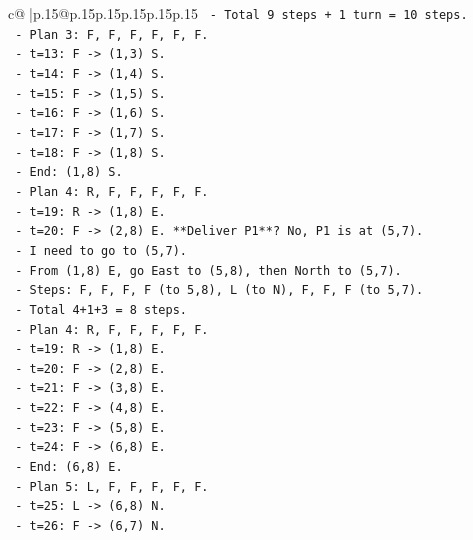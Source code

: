 \documentclass{article}
\begin{document}
{\begin{supertabular}{c@{$\;$}|p{.15\linewidth}@{}p{.15\linewidth}p{.15\linewidth}p{.15\linewidth}p{.15\linewidth}p{.15\linewidth}}
{{{\texttt{              {-} Total 9 steps + 1 turn = 10 steps.} \\
\texttt{              {-} Plan 3: F, F, F, F, F, F.} \\
\texttt{                {-} t=13: F {-}> (1,3) S.} \\
\texttt{                {-} t=14: F {-}> (1,4) S.} \\
\texttt{                {-} t=15: F {-}> (1,5) S.} \\
\texttt{                {-} t=16: F {-}> (1,6) S.} \\
\texttt{                {-} t=17: F {-}> (1,7) S.} \\
\texttt{                {-} t=18: F {-}> (1,8) S.} \\
\texttt{                {-} End: (1,8) S.} \\
\texttt{              {-} Plan 4: R, F, F, F, F, F.} \\
\texttt{                {-} t=19: R {-}> (1,8) E.} \\
\texttt{                {-} t=20: F {-}> (2,8) E. **Deliver P1**? No, P1 is at (5,7).} \\
\texttt{                {-} I need to go to (5,7).} \\
\texttt{                {-} From (1,8) E, go East to (5,8), then North to (5,7).} \\
\texttt{                {-} Steps: F, F, F, F (to 5,8), L (to N), F, F, F (to 5,7).} \\
\texttt{                {-} Total 4+1+3 = 8 steps.} \\
\texttt{                {-} Plan 4: R, F, F, F, F, F.} \\
\texttt{                  {-} t=19: R {-}> (1,8) E.} \\
\texttt{                  {-} t=20: F {-}> (2,8) E.} \\
\texttt{                  {-} t=21: F {-}> (3,8) E.} \\
\texttt{                  {-} t=22: F {-}> (4,8) E.} \\
\texttt{                  {-} t=23: F {-}> (5,8) E.} \\
\texttt{                  {-} t=24: F {-}> (6,8) E.} \\
\texttt{                  {-} End: (6,8) E.} \\
\texttt{                {-} Plan 5: L, F, F, F, F, F.} \\
\texttt{                  {-} t=25: L {-}> (6,8) N.} \\
\texttt{                  {-} t=26: F {-}> (6,7) N.} \\
}}}
\end{supertabular}}
\end{document}
